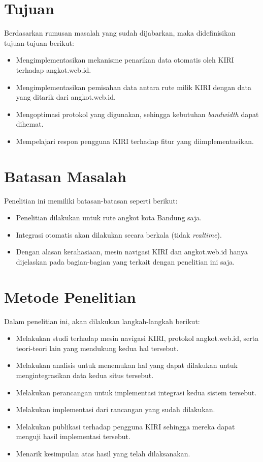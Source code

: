 \section{Tujuan}
\label{sec:tujuan}
Berdasarkan rumusan masalah yang sudah dijabarkan, maka didefinisikan tujuan-tujuan
berikut:
\begin{itemize}
	\item Mengimplementasikan mekanisme penarikan data otomatis oleh KIRI
		terhadap angkot.web.id.
	\item Mengimplementasikan pemisahan data antara rute milik KIRI dengan data
		yang ditarik dari angkot.web.id.
	\item Mengoptimasi protokol yang digunakan, sehingga kebutuhan
		\textit{bandwidth} dapat dihemat.
	\item Mempelajari respon pengguna KIRI terhadap fitur yang diimplementasikan.
\end{itemize}

\section{Batasan Masalah}
\label{sec:batasan_masalah}
Penelitian ini memiliki batasan-batasan seperti berikut:
\begin{itemize}
	\item Penelitian dilakukan untuk rute angkot kota Bandung saja.
	\item Integrasi otomatis akan dilakukan secara berkala
		(tidak \textit{realtime}).
	\item Dengan alasan kerahasiaan, mesin navigasi KIRI dan angkot.web.id
		hanya dijelaskan pada bagian-bagian yang terkait dengan penelitian
		ini saja.
\end{itemize}

\section{Metode Penelitian}
\label{sec:metode_penelitian}
Dalam penelitian ini, akan dilakukan langkah-langkah berikut:
\begin{itemize}
	\item Melakukan studi terhadap mesin navigasi KIRI, protokol angkot.web.id,
		serta teori-teori lain yang mendukung kedua hal tersebut.
	\item Melakukan analisis untuk menemukan hal yang dapat dilakukan untuk
		mengintegrasikan data kedua situs tersebut.
	\item Melakukan perancangan untuk implementasi integrasi kedua sistem
		tersebut.
	\item Melakukan implementasi dari rancangan yang sudah dilakukan.
	\item Melakukan publikasi terhadap pengguna KIRI sehingga mereka dapat
		menguji hasil implementasi tersebut.
	\item Menarik kesimpulan atas hasil yang telah dilaksanakan.
\end{itemize}

